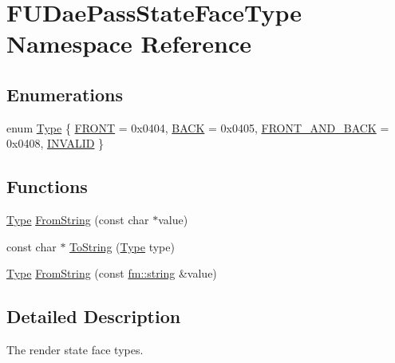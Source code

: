 \hypertarget{namespaceFUDaePassStateFaceType}{
\section{FUDaePassStateFaceType Namespace Reference}
\label{namespaceFUDaePassStateFaceType}
}
\subsection*{Enumerations}
\begin{DoxyCompactItemize}
\item 
enum \hyperlink{namespaceFUDaePassStateFaceType_a67c5007ab2cdb2e4fedc5fb800b82b4a}{Type} \{ \hyperlink{namespaceFUDaePassStateFaceType_a67c5007ab2cdb2e4fedc5fb800b82b4aacaa4b063604865112819e36222da6ac7}{FRONT} =  0x0404, 
\hyperlink{namespaceFUDaePassStateFaceType_a67c5007ab2cdb2e4fedc5fb800b82b4aa1ca8373dcda6764c667c9cef6c085ccc}{BACK} =  0x0405, 
\hyperlink{namespaceFUDaePassStateFaceType_a67c5007ab2cdb2e4fedc5fb800b82b4aa97874d57fc5a1f44a176de1d659d78fe}{FRONT\_\-AND\_\-BACK} =  0x0408, 
\hyperlink{namespaceFUDaePassStateFaceType_a67c5007ab2cdb2e4fedc5fb800b82b4aa3f13f84e92f024db9b0a5cbe0e430ed4}{INVALID}
 \}
\end{DoxyCompactItemize}
\subsection*{Functions}
\begin{DoxyCompactItemize}
\item 
\hyperlink{namespaceFUDaePassStateFaceType_a67c5007ab2cdb2e4fedc5fb800b82b4a}{Type} \hyperlink{namespaceFUDaePassStateFaceType_ad42fe9c27acba1f75eb261fb47f4a597}{FromString} (const char $\ast$value)
\item 
const char $\ast$ \hyperlink{namespaceFUDaePassStateFaceType_a783649a9ba7bc1f3216fca293e271269}{ToString} (\hyperlink{namespaceFUDaePassStateFaceType_a67c5007ab2cdb2e4fedc5fb800b82b4a}{Type} type)
\item 
\hyperlink{namespaceFUDaePassStateFaceType_a67c5007ab2cdb2e4fedc5fb800b82b4a}{Type} \hyperlink{namespaceFUDaePassStateFaceType_a5426feee00706b5391145a2f218f5151}{FromString} (const \hyperlink{classfm_1_1stringT}{fm::string} \&value)
\end{DoxyCompactItemize}


\subsection{Detailed Description}
The render state face types. 

